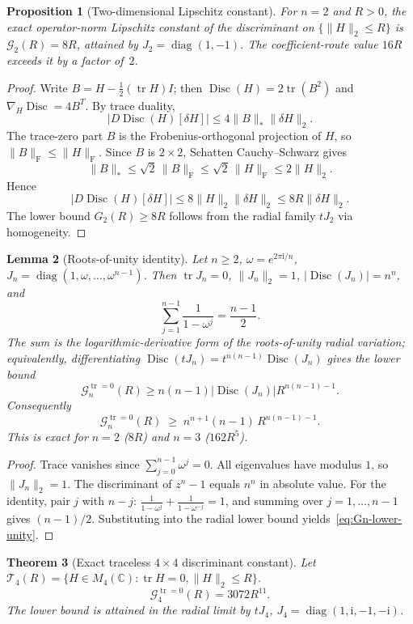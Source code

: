 \documentclass[11pt]{article}
\newtheorem{theorem}{Theorem}[section]
\newtheorem{proposition}[theorem]{Proposition}
\newtheorem{lemma}[theorem]{Lemma}
\numberwithin{equation}{section}
\DeclareMathOperator{\Disc}{Disc}
\DeclareMathOperator{\tr}{tr}
\DeclareMathOperator{\diag}{diag}
\newcommand{\bbC}{\mathbb C}
\newcommand{\cG}{\mathcal G}
\newcommand{\cT}{\mathcal T}
\newcommand{\ii}{\mathrm i}
\begin{document}
\begin{proposition}[Two-dimensional Lipschitz constant]\label{prop:n2-exact}
For $n=2$ and $R>0$, the exact operator-norm Lipschitz constant of the
discriminant on $\{\|H\|_2\le R\}$ is $\cG_2(R)=8R$, attained by
$J_2=\diag(1,-1)$.  The coefficient-route value $16R$ exceeds it by a factor of~$2$.
\end{proposition}

\begin{proof}
Write $B=H-\frac12(\tr H)I$; then $\Disc(H)=2\tr(B^2)$ and
$\nabla_H\Disc=4B^T$.  By trace duality,
\[
  |D\Disc(H)[\delta H]|
  \le 4\|B\|_*\|\delta H\|_2 .
\]
The trace-zero part \(B\) is the Frobenius-orthogonal projection of \(H\),
so \(\|B\|_{\mathrm F}\le\|H\|_{\mathrm F}\).  Since \(B\) is \(2\times2\),
Schatten Cauchy--Schwarz gives
\[
  \|B\|_*\le\sqrt2\,\|B\|_{\mathrm F}
  \le \sqrt2\,\|H\|_{\mathrm F}
  \le 2\|H\|_2 .
\]
Hence
\[
  |D\Disc(H)[\delta H]|
  \le8\|H\|_2\|\delta H\|_2\le8R\|\delta H\|_2 .
\]
The lower bound $G_2(R)\ge8R$ follows from the radial family $tJ_2$ via homogeneity.
\end{proof}

\begin{lemma}[Roots-of-unity identity]\label{lem:roots-unity}
Let $n\ge2$, $\omega=e^{2\pi\ii/n}$, $J_n=\diag(1,\omega,\ldots,\omega^{n-1})$.
Then $\tr J_n=0$, $\|J_n\|_2=1$, $|\Disc(J_n)|=n^n$, and
\[
  \sum_{j=1}^{n-1}\frac{1}{1-\omega^j}=\frac{n-1}{2}.
\]
The sum is the logarithmic-derivative form of the roots-of-unity radial
variation; equivalently, differentiating
\(\Disc(tJ_n)=t^{n(n-1)}\Disc(J_n)\) gives the lower bound
\[
  \cG_n^{\tr=0}(R)\ge n(n-1)|\Disc(J_n)|R^{n(n-1)-1}.
\]
Consequently
\begin{equation}\label{eq:Gn-lower-unity}
  \cG_n^{\tr=0}(R)\;\ge\;n^{n+1}(n-1)\,R^{n(n-1)-1}.
\end{equation}
This is exact for $n=2$ ($8R$) and $n=3$ ($162R^5$).
\end{lemma}

\begin{proof}
Trace vanishes since $\sum_{j=0}^{n-1}\omega^j=0$.  All eigenvalues have modulus $1$,
so $\|J_n\|_2=1$.  The discriminant of $z^n-1$ equals $n^n$ in absolute value.
For the identity, pair $j$ with $n-j$:
$\tfrac{1}{1-\omega^j}+\tfrac{1}{1-\omega^{-j}}=1$,
and summing over $j=1,\ldots,n-1$ gives $(n-1)/2$.
Substituting into the radial lower bound yields~\eqref{eq:Gn-lower-unity}.
\end{proof}

\begin{theorem}[Exact traceless \(4\times4\) discriminant constant]\label{thm:tr0-4x4}
Let $\cT_4(R)=\{H\in M_4(\bbC):\tr H=0,\|H\|_2\le R\}$.
\[
  \cG_4^{\tr=0}(R)=3072R^{11}.
\]
The lower bound is attained in the radial limit by
\(tJ_4\), \(J_4=\diag(1,\ii,-1,-\ii)\).
\end{theorem}
\end{document}
